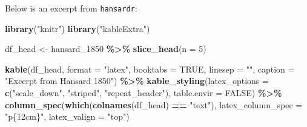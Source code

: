 \documentclass[
]{article}
\newenvironment{Shaded}{\begin{snugshade}}{\end{snugshade}}
\newcommand{\AttributeTok}[1]{\textcolor[rgb]{0.13,0.29,0.53}{#1}}
\newcommand{\ConstantTok}[1]{\textcolor[rgb]{0.56,0.35,0.01}{#1}}
\newcommand{\DecValTok}[1]{\textcolor[rgb]{0.00,0.00,0.81}{#1}}
\newcommand{\FunctionTok}[1]{\textcolor[rgb]{0.13,0.29,0.53}{\textbf{#1}}}
\newcommand{\NormalTok}[1]{#1}
\newcommand{\OtherTok}[1]{\textcolor[rgb]{0.56,0.35,0.01}{#1}}
\newcommand{\SpecialCharTok}[1]{\textcolor[rgb]{0.81,0.36,0.00}{\textbf{#1}}}
\newcommand{\StringTok}[1]{\textcolor[rgb]{0.31,0.60,0.02}{#1}}
\begin{document}
Below is an excerpt from \texttt{hansardr}:

\begin{Shaded}
\begin{Highlighting}[]
\FunctionTok{library}\NormalTok{(}\StringTok{"knitr"}\NormalTok{)}
\FunctionTok{library}\NormalTok{(}\StringTok{"kableExtra"}\NormalTok{)}

\NormalTok{df\_head }\OtherTok{\textless{}{-}}\NormalTok{ hansard\_1850 }\SpecialCharTok{\%\textgreater{}\%} 
  \FunctionTok{slice\_head}\NormalTok{(}\AttributeTok{n =} \DecValTok{5}\NormalTok{)}

\FunctionTok{kable}\NormalTok{(df\_head, }
      \AttributeTok{format =} \StringTok{"latex"}\NormalTok{, }
      \AttributeTok{booktabs =} \ConstantTok{TRUE}\NormalTok{, }
      \AttributeTok{linesep =} \StringTok{""}\NormalTok{,}
      \AttributeTok{caption =} \StringTok{"Excerpt from Hansard 1850"}\NormalTok{) }\SpecialCharTok{\%\textgreater{}\%}
  \FunctionTok{kable\_styling}\NormalTok{(}\AttributeTok{latex\_options =} \FunctionTok{c}\NormalTok{(}\StringTok{"scale\_down"}\NormalTok{, }\StringTok{"striped"}\NormalTok{, }\StringTok{"repeat\_header"}\NormalTok{),}
                \AttributeTok{table.envir =} \ConstantTok{FALSE}\NormalTok{) }\SpecialCharTok{\%\textgreater{}\%}
  \FunctionTok{column\_spec}\NormalTok{(}\FunctionTok{which}\NormalTok{(}\FunctionTok{colnames}\NormalTok{(df\_head) }\SpecialCharTok{==} \StringTok{"text"}\NormalTok{), }
              \AttributeTok{latex\_column\_spec =} \StringTok{"p\{12cm\}"}\NormalTok{, }
              \AttributeTok{latex\_valign =} \StringTok{"top"}\NormalTok{)}
\end{Highlighting}
\end{Shaded}
\end{document}
